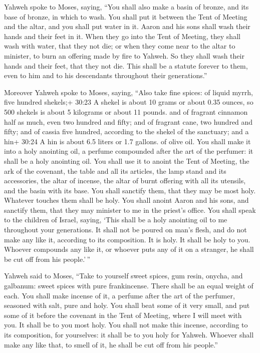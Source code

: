  Yahweh spoke to Moses, saying,  ``You shall
also make a basin of bronze, and its base of bronze, in which to wash.
You shall put it between the Tent of Meeting and the altar, and you
shall put water in it.  Aaron and his sons shall wash their
hands and their feet in it.  When they go into the Tent of
Meeting, they shall wash with water, that they not die; or when they
come near to the altar to minister, to burn an offering made by fire to
Yahweh.  So they shall wash their hands and their feet,
that they not die. This shall be a statute forever to them, even to him
and to his descendants throughout their generations.''

 Moreover Yahweh spoke to Moses, saying, 
``Also take fine spices: of liquid myrrh, five hundred shekels;+ 30:23 A
shekel is about 10 grams or about 0.35 ounces, so 500 shekels is about 5
kilograms or about 11 pounds. and of fragrant cinnamon half as much,
even two hundred and fifty; and of fragrant cane, two hundred and fifty;
 and of cassia five hundred, according to the shekel of the
sanctuary; and a hin+ 30:24 A hin is about 6.5 liters or 1.7 gallons. of
olive oil.  You shall make it into a holy anointing oil, a
perfume compounded after the art of the perfumer: it shall be a holy
anointing oil.  You shall use it to anoint the Tent of
Meeting, the ark of the covenant,  the table and all its
articles, the lamp stand and its accessories, the altar of incense,
 the altar of burnt offering with all its utensils, and the
basin with its base.  You shall sanctify them, that they
may be most holy. Whatever touches them shall be holy.  You
shall anoint Aaron and his sons, and sanctify them, that they may
minister to me in the priest's office.  You shall speak to
the children of Israel, saying, `This shall be a holy anointing oil to
me throughout your generations.  It shall not be poured on
man's flesh, and do not make any like it, according to its composition.
It is holy. It shall be holy to you.  Whoever compounds any
like it, or whoever puts any of it on a stranger, he shall be cut off
from his people.'\,''

 Yahweh said to Moses, ``Take to yourself sweet spices, gum
resin, onycha, and galbanum: sweet spices with pure frankincense. There
shall be an equal weight of each.  You shall make incense
of it, a perfume after the art of the perfumer, seasoned with salt, pure
and holy.  You shall beat some of it very small, and put
some of it before the covenant in the Tent of Meeting, where I will meet
with you. It shall be to you most holy.  You shall not make
this incense, according to its composition, for yourselves: it shall be
to you holy for Yahweh.  Whoever shall make any like that,
to smell of it, he shall be cut off from his people.''


